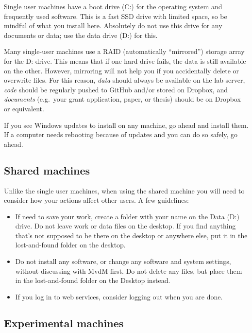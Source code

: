 \documentclass{tufte-book}
\begin{document}
Single user machines have a boot drive (C:) for the operating system
and frequently used software. This is a fast SSD drive with limited
space, so be mindful of what you install here. Absolutely do not use
this drive for any documents or data; use the data drive (D:) for this.

Many single-user machines use a RAID (automatically ``mirrored'')
storage array for the D: drive.  This means that if one hard drive
fails, the data is still available on the other.  However, mirroring
will not help you if you accidentally delete or overwrite files. For
this reason, {\it data} should always be available on the lab server,
{\it code} should be regularly pushed to GitHub and/or stored on
Dropbox, and {\it
  documents} (e.g.\ your grant application, paper, or thesis) should
be on Dropbox or equivalent.

If you see Windows updates to install on any machine, go ahead and
install them. If a computer needs rebooting because of updates and you
can do so safely, go ahead.

\subsection{Shared machines}

Unlike the single user machines, when using the shared machine you
will need to consider how your actions affect other users. A few
guidelines:

\begin{itemize}
\item{If need to save your work, create a folder with your name on the
  Data (D:) drive. Do not leave work or data files on the desktop. If
  you find anything that's not supposed to be there on the desktop or
  anywhere else, put it in the lost-and-found folder on the desktop.}
\item{Do not install any software, or change any software and system
  settings, without discussing with MvdM first. Do not delete any
  files, but place them in the lost-and-found folder on the Desktop
  instead.}
\item{If you log in to web services, consider logging out when you
  are done.}
\end{itemize}

\subsection{Experimental machines}
\end{document}
